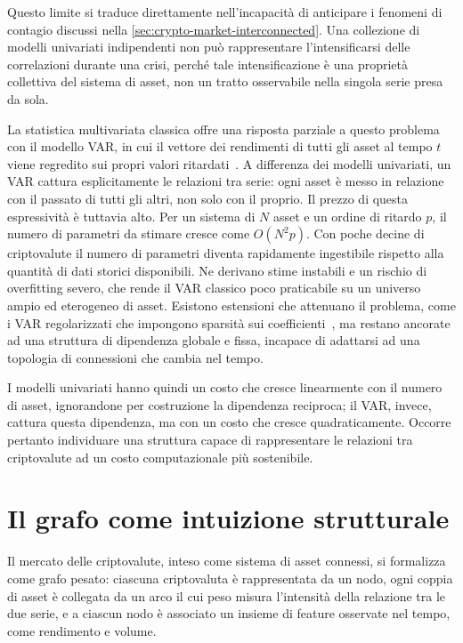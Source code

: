 Questo limite si traduce direttamente nell'incapacità di anticipare i fenomeni di contagio discussi nella \cref{sec:crypto-market-interconnected}. Una collezione di modelli univariati indipendenti non può rappresentare l'intensificarsi delle correlazioni durante una crisi, perché tale intensificazione è una proprietà collettiva del sistema di asset, non un tratto osservabile nella singola serie presa da sola.

La statistica multivariata classica offre una risposta parziale a questo problema con il modello VAR, in cui il vettore dei rendimenti di tutti gli asset al tempo $t$ viene regredito sui propri valori ritardati~\cite{lutkepohl2005new}. A differenza dei modelli univariati, un VAR cattura esplicitamente le relazioni tra serie: ogni asset è messo in relazione con il passato di tutti gli altri, non solo con il proprio. Il prezzo di questa espressività è tuttavia alto. Per un sistema di $N$ asset e un ordine di ritardo $p$, il numero di parametri da stimare cresce come $O(N^2 p)$. Con poche decine di criptovalute il numero di parametri diventa rapidamente ingestibile rispetto alla quantità di dati storici disponibili. Ne derivano stime instabili e un rischio di overfitting severo, che rende il VAR classico poco praticabile su un universo ampio ed eterogeneo di asset. Esistono estensioni che attenuano il problema, come i VAR regolarizzati che impongono sparsità sui coefficienti~\cite{basu2015regularized}, ma restano ancorate ad una struttura di dipendenza globale e fissa, incapace di adattarsi ad una topologia di connessioni che cambia nel tempo.

I modelli univariati hanno quindi un costo che cresce linearmente con il numero di asset, ignorandone per costruzione la dipendenza reciproca; il VAR, invece, cattura questa dipendenza, ma con un costo che cresce quadraticamente. Occorre pertanto individuare una struttura capace di rappresentare le relazioni tra criptovalute ad un costo computazionale più sostenibile.

\section{Il grafo come intuizione strutturale}
\label{sec:why-graph-intuition}

Il mercato delle criptovalute, inteso come sistema di asset connessi, si formalizza come grafo pesato: ciascuna criptovaluta è rappresentata da un nodo, ogni coppia di asset è collegata da un arco il cui peso misura l'intensità della relazione tra le due serie, e a ciascun nodo è associato un insieme di feature osservate nel tempo, come rendimento e volume.

